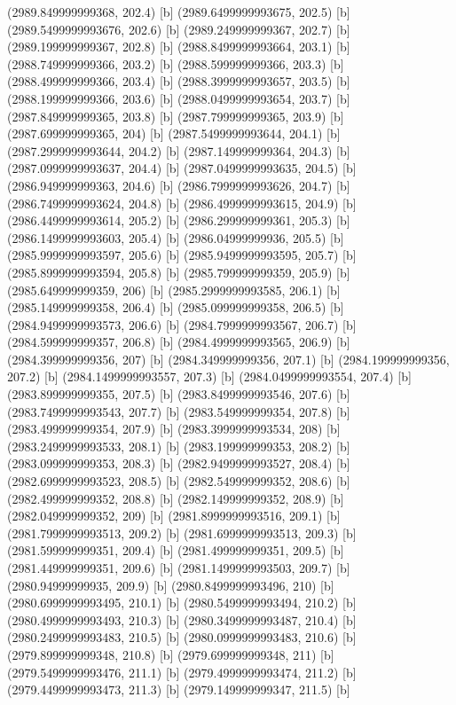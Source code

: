 {{{(2989.849999999368, 202.4) [b] 
(2989.6499999993675, 202.5) [b] 
(2989.5499999993676, 202.6) [b] 
(2989.249999999367, 202.7) [b] 
(2989.199999999367, 202.8) [b] 
(2988.8499999993664, 203.1) [b] 
(2988.749999999366, 203.2) [b] 
(2988.599999999366, 203.3) [b] 
(2988.499999999366, 203.4) [b] 
(2988.3999999993657, 203.5) [b] 
(2988.199999999366, 203.6) [b] 
(2988.0499999993654, 203.7) [b] 
(2987.849999999365, 203.8) [b] 
(2987.799999999365, 203.9) [b] 
(2987.699999999365, 204) [b] 
(2987.5499999993644, 204.1) [b] 
(2987.2999999993644, 204.2) [b] 
(2987.149999999364, 204.3) [b] 
(2987.0999999993637, 204.4) [b] 
(2987.0499999993635, 204.5) [b] 
(2986.949999999363, 204.6) [b] 
(2986.7999999993626, 204.7) [b] 
(2986.7499999993624, 204.8) [b] 
(2986.4999999993615, 204.9) [b] 
(2986.4499999993614, 205.2) [b] 
(2986.299999999361, 205.3) [b] 
(2986.1499999993603, 205.4) [b] 
(2986.04999999936, 205.5) [b] 
(2985.9999999993597, 205.6) [b] 
(2985.9499999993595, 205.7) [b] 
(2985.8999999993594, 205.8) [b] 
(2985.799999999359, 205.9) [b] 
(2985.649999999359, 206) [b] 
(2985.2999999993585, 206.1) [b] 
(2985.149999999358, 206.4) [b] 
(2985.099999999358, 206.5) [b] 
(2984.9499999993573, 206.6) [b] 
(2984.7999999993567, 206.7) [b] 
(2984.599999999357, 206.8) [b] 
(2984.4999999993565, 206.9) [b] 
(2984.399999999356, 207) [b] 
(2984.349999999356, 207.1) [b] 
(2984.199999999356, 207.2) [b] 
(2984.1499999993557, 207.3) [b] 
(2984.0499999993554, 207.4) [b] 
(2983.899999999355, 207.5) [b] 
(2983.8499999993546, 207.6) [b] 
(2983.7499999993543, 207.7) [b] 
(2983.549999999354, 207.8) [b] 
(2983.499999999354, 207.9) [b] 
(2983.3999999993534, 208) [b] 
(2983.2499999993533, 208.1) [b] 
(2983.199999999353, 208.2) [b] 
(2983.099999999353, 208.3) [b] 
(2982.9499999993527, 208.4) [b] 
(2982.6999999993523, 208.5) [b] 
(2982.549999999352, 208.6) [b] 
(2982.499999999352, 208.8) [b] 
(2982.149999999352, 208.9) [b] 
(2982.049999999352, 209) [b] 
(2981.8999999993516, 209.1) [b] 
(2981.7999999993513, 209.2) [b] 
(2981.6999999993513, 209.3) [b] 
(2981.599999999351, 209.4) [b] 
(2981.499999999351, 209.5) [b] 
(2981.449999999351, 209.6) [b] 
(2981.1499999993503, 209.7) [b] 
(2980.94999999935, 209.9) [b] 
(2980.8499999993496, 210) [b] 
(2980.6999999993495, 210.1) [b] 
(2980.5499999993494, 210.2) [b] 
(2980.4999999993493, 210.3) [b] 
(2980.3499999993487, 210.4) [b] 
(2980.2499999993483, 210.5) [b] 
(2980.0999999993483, 210.6) [b] 
(2979.899999999348, 210.8) [b] 
(2979.699999999348, 211) [b] 
(2979.5499999993476, 211.1) [b] 
(2979.4999999993474, 211.2) [b] 
(2979.4499999993473, 211.3) [b] 
(2979.149999999347, 211.5) [b] 
}}}
